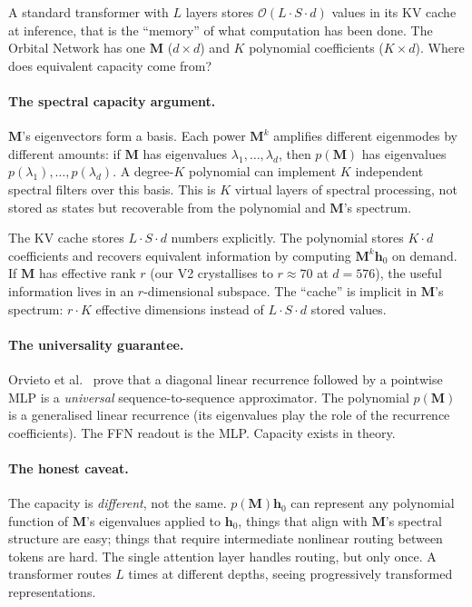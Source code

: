 \documentclass[11pt, a4paper]{article}
\newcommand{\M}{\mathbf{M}}
\newcommand{\h}{\mathbf{h}}
\newcommand{\bigO}{\mathcal{O}}
\theoremstyle{plain}
\theoremstyle{definition}
\theoremstyle{remark}
\begin{document}
A standard transformer with $L$ layers stores $\bigO(L \cdot S \cdot d)$ values in its KV cache at inference, that is the ``memory'' of what computation has been done.
The Orbital Network has one $\M$ ($d \times d$) and $K$ polynomial coefficients ($K \times d$).
Where does equivalent capacity come from?

\paragraph{The spectral capacity argument.}
$\M$'s eigenvectors form a basis.
Each power $\M^k$ amplifies different eigenmodes by different amounts: if $\M$ has eigenvalues $\lambda_1, \ldots, \lambda_d$, then $p(\M)$ has eigenvalues $p(\lambda_1), \ldots, p(\lambda_d)$.
A degree-$K$ polynomial can implement $K$ independent spectral filters over this basis.
This is $K$ virtual layers of spectral processing, not stored as states but recoverable from the polynomial and $\M$'s spectrum.

The KV cache stores $L \cdot S \cdot d$ numbers explicitly.
The polynomial stores $K \cdot d$ coefficients and recovers equivalent information by computing $\M^k \h_0$ on demand.
If $\M$ has effective rank $r$ (our V2 crystallises to $r \approx 70$ at $d = 576$), the useful information lives in an $r$-dimensional subspace.
The ``cache'' is implicit in $\M$'s spectrum: $r \cdot K$ effective dimensions instead of $L \cdot S \cdot d$ stored values.

\paragraph{The universality guarantee.}
Orvieto et al.~\cite{orvieto2023universality} prove that a diagonal linear recurrence followed by a pointwise MLP is a \emph{universal} sequence-to-sequence approximator.
The polynomial $p(\M)$ is a generalised linear recurrence (its eigenvalues play the role of the recurrence coefficients).
The FFN readout is the MLP.
Capacity exists in theory.

\paragraph{The honest caveat.}
The capacity is \emph{different}, not the same.
$p(\M) \h_0$ can represent any polynomial function of $\M$'s eigenvalues applied to $\h_0$, things that align with $\M$'s spectral structure are easy; things that require intermediate nonlinear routing between tokens are hard.
The single attention layer handles routing, but only once.
A transformer routes $L$ times at different depths, seeing progressively transformed representations.
\end{document}
